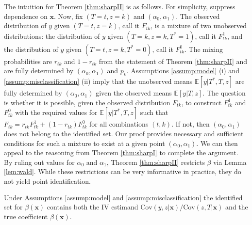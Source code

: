 
The intuition for Theorem \ref{thm:sharpII} is as follows.
For simplicity, suppress dependence on $\mathbf{x}$.
Now, fix $(T=t, z=k)$ and $(\alpha_0, \alpha_1)$.
The observed distribution of $y$ given $(T=t,z=k)$, call it $F_{tk}$, is a mixture of two unobserved distributions: the distribution of $y$ given $(T=k,z=k,T^*=1)$, call it $F^1_{tk}$, and the distribution of $y$ given $(T=t,z=k,T^*=0)$, call it $F^{0}_{tk}$.
The mixing probabilities are $r_{tk}$ and $1-r_{tk}$ from the statement of Theorem \ref{thm:sharpII} and are fully determined by $(\alpha_0, \alpha_1)$ and $p_k$.
Assumptions \ref{assump:model} (i) and \ref{assump:misclassification} (ii) imply that the unobserved means $\mathbb{E}[y|T^*,T,z]$  are fully determined by $(\alpha_0, \alpha_1)$ given the observed means $\mathbb{E}[y|T,z]$.
The question is whether it is possible, given the observed distribution $F_{tk}$, to construct $F^1_{tk}$ and $F^{0}_{tk}$ with the required values for $\mathbb{E}[y|T^*,T,z]$ such that $F_{tk} = r_{tk} F^{1}_{tk} + (1 - r_{tk}) F^{0}_{tk}$ for all combinations $(t,k)$. 
If not, then $(\alpha_0, \alpha_1)$ does not belong to the identified set.
Our proof provides necessary and sufficient conditions for such a mixture to exist at a given point $(\alpha_0, \alpha_1)$.
We can then appeal to the reasoning from Theorem \ref{thm:sharpI} to complete the argument.
By ruling out values for $\alpha_0$ and $\alpha_1$, Theorem \ref{thm:sharpII} restricts $\beta$ via Lemma \ref{lem:wald}. 
While these restrictions can be very informative in practice, they do not yield point identification.

\begin{cor}
  Under Assumptions \ref{assump:model} and \ref{assump:misclassification} the identified set for $\beta(\mathbf{x})$ contains both the IV estimand $\mbox{Cov}(y,z|\mathbf{x})/\mbox{Cov}(z,T|\mathbf{x})$ and the true coefficient $\beta(\mathbf{x})$.
  \label{cor:nonident}
\end{cor}

